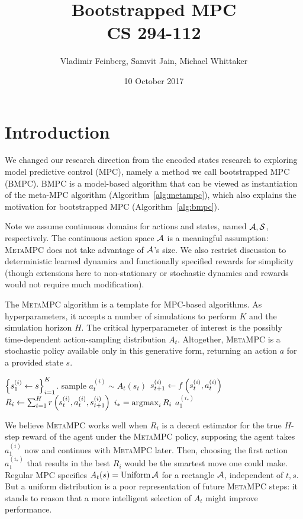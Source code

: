 \documentclass{article}
\title{Bootstrapped MPC\\\large CS 294-112}
\author{Vladimir Feinberg, Samvit Jain, Michael Whittaker}
\date{10 October 2017}
\begin{document}
	
\maketitle

\section{Introduction}

We changed our research direction from the encoded states research to exploring model predictive control (MPC), namely a method we call bootstrapped MPC (\textsc{BMPC}). \textsc{BMPC} is a model-based algorithm that can be viewed as instantiation of the meta-MPC algorithm (Algorithm~\ref{alg:metampc}), which also explains the motivation for bootstrapped MPC (Algorithm~\ref{alg:bmpc}).

Note we assume continuous domains for actions and states, named $\mathcal{A}, \mathcal{S}$, respectively. The continuous action space $\mathcal{A}$ is a meaningful assumption: \textsc{MetaMPC} does not take advantage of $\mathcal{A}$'s size. We also restrict discussion to deterministic learned dynamics and functionally specified rewards for simplicity (though extensions here to non-stationary or stochastic dynamics and rewards would not require much modification).

\begin{algorithm}
\caption{The \textsc{MetaMPC} algorithm is a template for MPC-based algorithms. As hyperparameters, it accepts a number of simulations to perform $K$ and the simulation horizon $H$. The critical hyperparameter of interest is the possibly time-dependent action-sampling distribution $A_t$. Altogether, \textsc{MetaMPC} is a stochastic policy available only in this generative form, returning an action $a$ for a provided state $s$.}\label{alg:metampc}
\begin{algorithmic}[1]
\State $\left\{{s_1^{(i)}\gets s}\right\}_{i=1}^K$.
\State sample $a_t^{(i)}\sim A_t(s_t)$
\State $s_{t+1}^{(i)}\gets f\left({s_t^{(i)},a_t^{(i)}}\right)$
\EndFor
\State $R_i\gets\sum_{t=1}^{H}r\left({s_{t}^{(i)},a_t^{(i)},s_{t+1}^{(i)}}\right)$
\EndFor
\State $i_*=\operatorname*{argmax}_i R_i$
\State \Return $a_1^{(i_*)}$
\EndProcedure
\end{algorithmic}
\end{algorithm}

We believe \textsc{MetaMPC} works well when $R_i$ is a decent estimator for the true $H$-step reward of the agent under the \textsc{MetaMPC} policy, supposing the agent takes $a_1^{(i)}$ now and continues with \textsc{MetaMPC} later. Then, choosing the first action $a_1^{(i_*)}$ that results in the best $R_i$ would be the smartest move one could make. Regular MPC specifies $A_t(s)=\operatorname{Uniform} \mathcal{A}$ for a rectangle $\mathcal{A}$, independent of $t,s$. But a uniform distribution is a poor representation of future \textsc{MetaMPC} steps: it stands to reason that a more intelligent selection of $A_t$ might improve performance.
\end{document}
